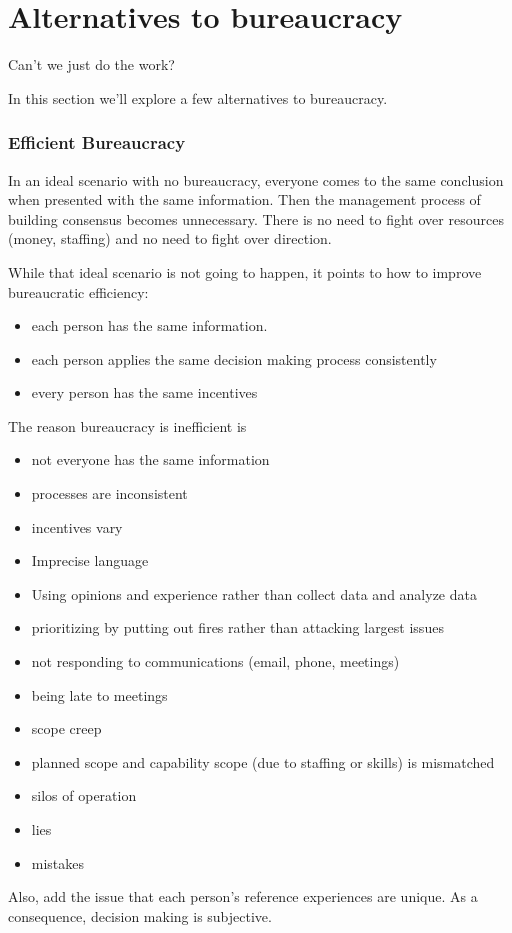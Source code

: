 \section{Alternatives to bureaucracy \label{sec:alternatives_to_bureaucracy}}
Can't we just do the work?

In this section we'll explore a few alternatives to bureaucracy. 




\subsubsection{Efficient Bureaucracy}

In an ideal scenario with no bureaucracy, everyone comes to the same conclusion when presented with the same information. Then the management process of building consensus becomes unnecessary. There is no need to fight over resources (money, staffing) and no need to fight over direction.

While that ideal scenario is not going to happen, it points to how to improve bureaucratic efficiency:
\begin{itemize}
\item each person has the same information. 
\item each person applies the same decision making process consistently
\item every person has the same incentives
\end{itemize}
The reason bureaucracy is inefficient is
\begin{itemize}
    \item not everyone has the same information
    \item processes are inconsistent
    \item incentives vary
    \item Imprecise language
    \item Using opinions and experience rather than collect data and analyze data
    \item prioritizing by putting out fires rather than attacking largest issues
    \item not responding to communications (email, phone, meetings)
    \item being late to meetings
    \item scope creep
    \item planned scope and capability scope (due to staffing or skills) is mismatched
    \item silos of operation
    \item lies
    \item mistakes
\end{itemize}
Also, add the issue that each person's reference experiences are unique. As a consequence, decision making is subjective. 




